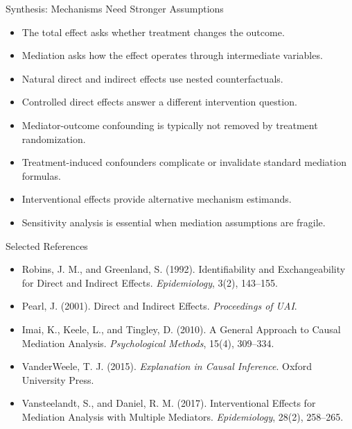 \documentclass[aspectratio=169,11pt]{beamer}
\begin{document}
\begin{frame}{Synthesis: Mechanisms Need Stronger Assumptions}
\begin{itemize}
\item The total effect asks whether treatment changes the outcome.
\item Mediation asks how the effect operates through intermediate variables.
\item Natural direct and indirect effects use nested counterfactuals.
\item Controlled direct effects answer a different intervention question.
\item Mediator-outcome confounding is typically not removed by treatment randomization.
\item Treatment-induced confounders complicate or invalidate standard mediation formulas.
\item Interventional effects provide alternative mechanism estimands.
\item Sensitivity analysis is essential when mediation assumptions are fragile.
\end{itemize}
\end{frame}

\begin{frame}{Selected References}
\small
\begin{itemize}
\item Robins, J. M., and Greenland, S. (1992). Identifiability and Exchangeability for Direct and Indirect Effects. \textit{Epidemiology}, 3(2), 143--155.
\item Pearl, J. (2001). Direct and Indirect Effects. \textit{Proceedings of UAI}.
\item Imai, K., Keele, L., and Tingley, D. (2010). A General Approach to Causal Mediation Analysis. \textit{Psychological Methods}, 15(4), 309--334.
\item VanderWeele, T. J. (2015). \textit{Explanation in Causal Inference}. Oxford University Press.
\item Vansteelandt, S., and Daniel, R. M. (2017). Interventional Effects for Mediation Analysis with Multiple Mediators. \textit{Epidemiology}, 28(2), 258--265.
\end{itemize}
\end{frame}

\contactslide
\end{document}
